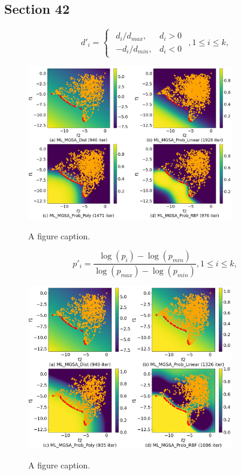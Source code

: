 \documentclass[runningheads]{llncs}
\begin{document}
\subsection{Section 42}
\label{ssec:42}


\begin{equation}
    \label{eq:17}
d'_i=
\begin{cases}
  \begin{matrix}
     d_i / d_{max}, & d_i > 0 \\
     -d_i / d_{min}, & d_i < 0 
  \end{matrix}
\end{cases}, 
1 \leq i \leq k,
\end{equation}

\begin{figure}
\center
\includegraphics[width=0.8\textwidth]{fig1.png}
\label{fig1}
\caption{A figure caption.} 
\end{figure}



\begin{equation}
    \label{eq:18}
p'_i= \frac{ \log (p_i) - \log (p_{min})}{ \log (p_{max}) - \log (p_{min})} , 1 \leq i \leq k,
\end{equation}

\begin{figure}
\center
\includegraphics[width=0.8\textwidth]{fig2.png}
\label{fig2}
\caption{A figure caption.} 
\end{figure}
\end{document}
